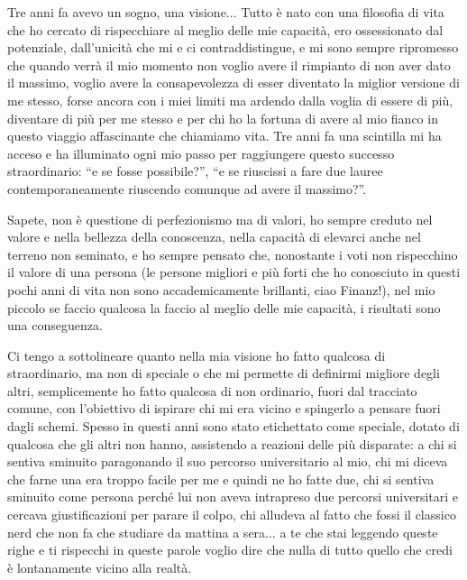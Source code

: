\documentclass[12pt, a4paper]{report}
\begin{document}
Tre anni fa avevo un sogno, una visione... Tutto è nato con una filosofia di vita che ho cercato di rispecchiare al meglio delle mie capacità, ero ossessionato dal potenziale, dall'unicità che mi e ci contraddistingue, e mi sono sempre ripromesso che quando verrà il mio momento non voglio avere il rimpianto di non aver dato il massimo, voglio avere la consapevolezza di esser diventato la miglior versione di me stesso, forse ancora con i miei limiti ma ardendo dalla voglia di essere di più, diventare di più per me stesso e per chi ho la fortuna di avere al mio fianco in questo viaggio affascinante che chiamiamo vita. Tre anni fa una scintilla mi ha acceso e ha illuminato ogni mio passo per raggiungere questo successo straordinario: ``e se fosse possibile?'', ``e se riuscissi a fare due lauree contemporaneamente riuscendo comunque ad avere il massimo?''.

Sapete, non è questione di perfezionismo ma di valori, ho sempre creduto nel valore e nella bellezza della conoscenza, nella capacità di elevarci anche nel terreno non seminato, e ho sempre pensato che, nonostante i voti non rispecchino il valore di una persona (le persone migliori e più forti che ho conosciuto in questi pochi anni di vita non sono accademicamente brillanti, ciao Finanz!), nel mio piccolo se faccio qualcosa la faccio al meglio delle mie capacità, i risultati sono una conseguenza.
\par
\vspace{\baselineskip}
Ci tengo a sottolineare quanto nella mia visione ho fatto qualcosa di straordinario, ma non di speciale o che mi permette di definirmi migliore degli altri, semplicemente ho fatto qualcosa di non ordinario, fuori dal tracciato comune, con l'obiettivo di ispirare chi mi era vicino e spingerlo a pensare fuori dagli schemi. Spesso in questi anni sono stato etichettato come speciale, dotato di qualcosa che gli altri non hanno, assistendo a reazioni delle più disparate: a chi si sentiva sminuito paragonando il suo percorso universitario al mio, chi mi diceva che farne una era troppo facile per me e quindi ne ho fatte due, chi si sentiva sminuito come persona perché lui non aveva intrapreso due percorsi universitari e cercava giustificazioni per parare il colpo, chi alludeva al fatto che fossi il classico nerd che non fa che studiare da mattina a sera... a te che stai leggendo queste righe e ti rispecchi in queste parole voglio dire che nulla di tutto quello che credi è lontanamente vicino alla realtà.
\end{document}
